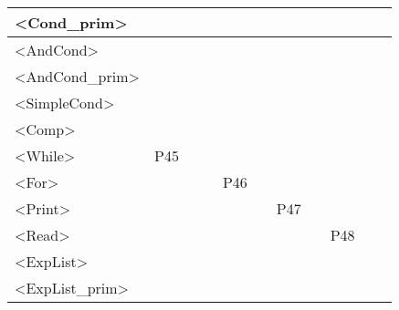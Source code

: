 \documentclass[12pt]{article}
\begin{document}
\begin{table}[H]
\begin{tabular}{|l|l|l|l|l|l|l|l|l|l|l|}
		\textless{}Cond\_prim\textgreater{}      &       &     &          &     &     &       &        &      \\ \hline
		\textless{}AndCond\textgreater{}         &       &     &          &     &     &       &        &      \\ \hline
		\textless{}AndCond\_prim\textgreater{}   &       &     &          &     &     &       &        &      \\ \hline
		\textless{}SimpleCond\textgreater{}      &       &     &          &     &     &       &        &      \\ \hline
		\textless{}Comp\textgreater{}            &       &     &          &     &     &       &        &      \\ \hline
		\textless{}While\textgreater{}           & P45   &     &          &     &     &       &        &      \\ \hline
		\textless{}For\textgreater{}             &       &     &          & P46 &     &       &        &      \\ \hline
		\textless{}Print\textgreater{}           &       &     &          &     &     & P47   &        &      \\ \hline
		\textless{}Read\textgreater{}            &       &     &          &     &     &       &        & P48  \\ \hline
		\textless{}ExpList\textgreater{}         &       &     &          &     &     &       &        &      \\ \hline
		\textless{}ExpList\_prim\textgreater{}   &       &     &          &     &     &       &        &      \\ \hline
	\end{tabular}
\end{table}
\end{document}
